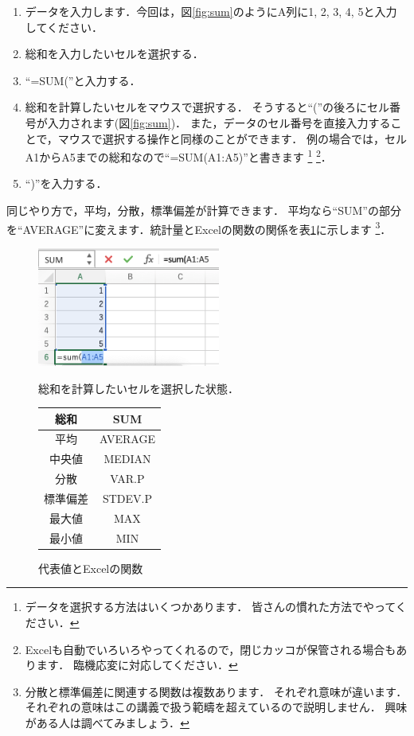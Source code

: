 \begin{enumerate}
    \item データを入力します．今回は，図\ref{fig:sum}のようにA列に1, 2, 3, 4, 5と入力してください．
    \item 総和を入力したいセルを選択する．
    \item ``=SUM(''と入力する．
    \item 総和を計算したいセルをマウスで選択する．
    そうすると``(''の後ろにセル番号が入力されます(図\ref{fig:sum})．
    また，データのセル番号を直接入力することで，マウスで選択する操作と同様のことができます．
    例の場合では，セルA1からA5までの総和なので``=SUM(A1:A5)''と書きます
    \footnote{データを選択する方法はいくつかあります．
      皆さんの慣れた方法でやってください．}
    \footnote{Excelも自動でいろいろやってくれるので，閉じカッコが保管される場合もあります．
      臨機応変に対応してください．}．
    \item ``)''を入力する．
\end{enumerate}

同じやり方で，平均，分散，標準偏差が計算できます．
平均なら``SUM''の部分を``AVERAGE''に変えます．統計量とExcelの関数の関係を表\ref{tab:funcs}に示します
\footnote{分散と標準偏差に関連する関数は複数あります．
  それぞれ意味が違います．
  それぞれの意味はこの講義で扱う範疇を超えているので説明しません．
  興味がある人は調べてみましょう．}．

\begin{figure}[htbp]
    \begin{minipage}{0.5\hsize}
        \centering
        \includegraphics[width=6cm]{chap1/sum.png}
        \caption{総和を計算したいセルを選択した状態．}
        \label{fig:sum}
    \end{minipage}
    \begin{minipage}{0.5\hsize}
        \centering
        \makeatletter
        \def\@captype{table}
        \makeatother
        \caption{代表値とExcelの関数}
        \begin{tabular}{|c|c|}
          \hline
          総和     & SUM\\ \hline
          平均     & AVERAGE\\ \hline
          中央値   & MEDIAN \\ \hline
          分散     & VAR.P\\ \hline
          標準偏差 & STDEV.P \\ \hline
          最大値   & MAX \\ \hline
          最小値   & MIN \\ \hline
        \end{tabular}
        \label{tab:funcs}
    \end{minipage}
\end{figure}

